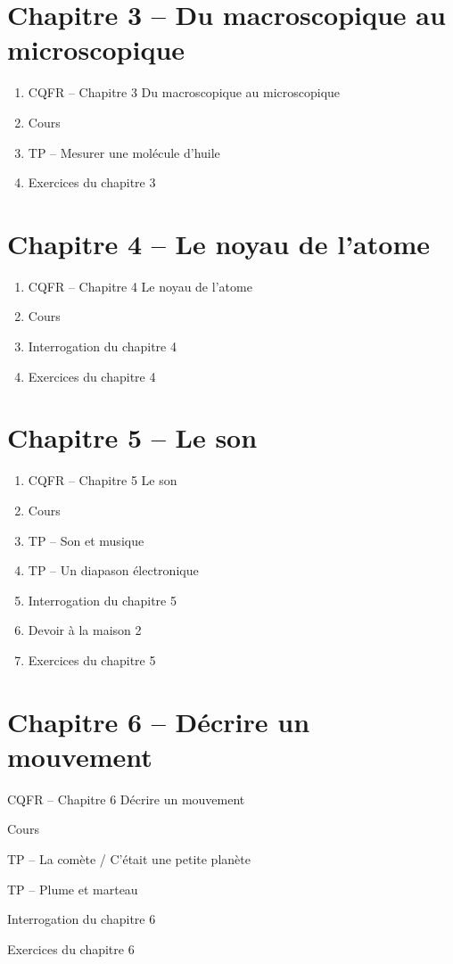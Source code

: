 \documentclass[12pt,a4paper]{article}
\begin{document}
\section*{Chapitre 3 -- Du macroscopique au microscopique}

\begin{enumerate}
\item CQFR -- Chapitre 3 Du macroscopique au microscopique
\item Cours
\item TP -- Mesurer une molécule d'huile
\item Exercices du chapitre 3
\end{enumerate}

\section*{Chapitre 4 -- Le noyau de l'atome}

\begin{enumerate}
\item CQFR -- Chapitre 4 Le noyau de l'atome
\item Cours
\item Interrogation du chapitre 4
\item Exercices du chapitre 4
\end{enumerate}

\section*{Chapitre 5 -- Le son}

\begin{enumerate}
\item CQFR -- Chapitre 5 Le son
\item Cours
\item TP -- Son et musique
\item TP -- Un diapason électronique
\item Interrogation du chapitre 5
\item Devoir à la maison 2
\item Exercices du chapitre 5
\end{enumerate}

\section*{Chapitre 6 -- Décrire un mouvement}

\begin{enumerate}
\item CQFR -- Chapitre 6 Décrire un mouvement
\item Cours
\item TP -- La comète / C'était une petite planète
{\color{gray_c}\item TP -- Plume et marteau}
{\color{gray_c}\item Interrogation du chapitre 6}
\item Exercices du chapitre 6
\end{enumerate}
\end{document}
